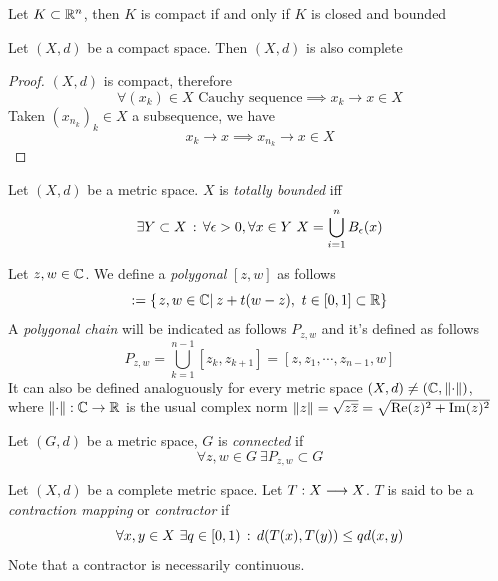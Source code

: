 \documentclass[../complete.tex]{subfiles}
\begin{document}
\begin{thm}
	Let $K\subset\mathbb{R}^n$, then $K$ is compact if and only if $K$ is closed and bounded
\end{thm}
\begin{thm}
	Let $(X,d)$ be a compact space. Then $(X,d)$ is also complete
\end{thm}
\begin{proof}
	$(X,d)$ is compact, therefore
	\begin{equation*}
		\forall(x_k)\in X\text{ Cauchy sequence}\implies{} x_k\to x\in X
	\end{equation*}
	Taken $(x_{n_k})_k\in X$ a subsequence, we have
	\begin{equation*}
		x_{k}\to x\implies{} x_{n_k}\to x\in X
	\end{equation*}
\end{proof}
\begin{dfn}
	Let $(X,d)$ be a metric space. $X$ is \textit{totally bounded} iff
	\begin{equation*}
		\exists Y\subset X\st\forall\epsilon>0,\forall x\in Y\ X=\bigcup_{i=1}^nB_\epsilon(x)
	\end{equation*}
\end{dfn}
\begin{dfn}
	Let $z,w\in\mathbb{C}$. We define a \textit{polygonal} $[z,w]$ as follows
	\begin{equation*}
		[z,w]:=\{\derin{z,w\in\Cf}z+t(w-z),\ t\in[0,1]\subset\R\}
	\end{equation*}
	A \textit{polygonal chain} will be indicated as follows $P_{z,w}$ and it's defined as follows
	\begin{equation*}
		P_{z,w}=\bigcup_{k=1}^{n-1}[z_k,z_{k+1}]=[z,z_1,\cdots,z_{n-1},w]
	\end{equation*}
	It can also be defined analoguously for every metric space $(X,d)\ne(\mathbb{C},\norm{\cdot})$, where $\norm{\cdot}:\mathbb{C}\to\mathbb{R}$ is the usual complex norm $\norm{z}=\sqrt{z\overline{z}}=\sqrt{\Re(z)^2+\Im(z)^2}$
\end{dfn}
\begin{dfn}
	Let $(G,d)$ be a metric space, $G$ is \textit{connected} if
	\begin{equation*}
		\forall z,w\in G\ \exists P_{z,w}\subset G
	\end{equation*}
\end{dfn}
\begin{dfn}
	Let $(X,d)$ be a complete metric space. Let $T:X\overset{}{\longrightarrow} X$. $T$ is said to be a \textit{contraction mapping} or \textit{contractor} if
	\begin{equation}
		\forall x,y\in X\ \exists q\in[0,1)\, :\,  d(T(x),T(y))\le qd(x,y)
		\label{eq:contractor}
	\end{equation}
	Note that a contractor is necessarily continuous.
\end{dfn}
\end{document}
